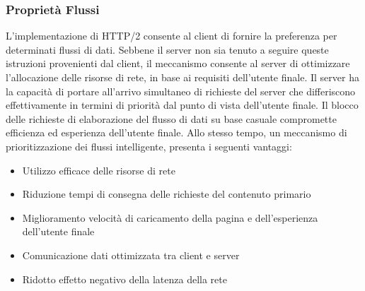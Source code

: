 \documentclass[a4paper,11pt]{article}
\begin{document}
\subsubsection{Proprietà Flussi}
L’implementazione di HTTP/2 consente al client di fornire la preferenza per determinati flussi di dati.\newline
Sebbene il server non sia tenuto a seguire queste istruzioni provenienti dal client, il meccanismo consente al server di ottimizzare l’allocazione delle risorse di rete, in base ai requisiti dell'utente finale.\newline
Il server ha la capacità di portare all’arrivo simultaneo di richieste del server che differiscono effettivamente in termini di priorità dal punto di vista dell’utente finale. Il blocco delle richieste di elaborazione del flusso di dati su base casuale compromette efficienza ed esperienza dell’utente finale.\bigbreak
\noindent Allo stesso tempo, un meccanismo di prioritizzazione dei flussi intelligente, presenta i seguenti vantaggi:
\begin{itemize}
    \item Utilizzo efficace delle risorse di rete
    \item Riduzione tempi di consegna delle richieste del contenuto primario
    \item Miglioramento velocità di caricamento della pagina e dell’esperienza dell’utente finale
    \item Comunicazione dati ottimizzata tra client e server
    \item Ridotto effetto negativo della latenza della rete
\end{itemize}
\end{document}
